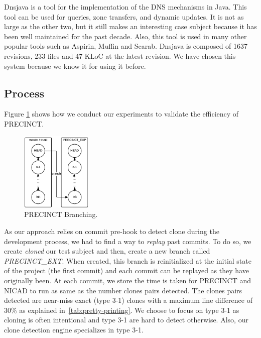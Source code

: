 \documentclass[conference]{IEEEtran}
\begin{document}
Dnsjava \cite{Wellington2013} is a tool for the implementation of the DNS mechanisms in Java.
This tool can be used for queries, zone transfers, and dynamic updates.
It is not as large as the other two, but it still makes an interesting case subject because it has been well maintained for the past decade.
Also, this tool is used in many other popular tools such as Aspirin, Muffin and
Scarab.
Dnsjava is composed of 1637 revisions, 233 files and 47 KLoC at the latest revision.
We have chosen this system because we know it for using it before\cite{Nayrolles2015c}.

\subsection{Process}
\label{sub:Process}


Figure \ref{fig:precinct-branching} shows how we conduct our experiments to validate the efficiency of PRECINCT.

\begin{figure}
  \centering
    \includegraphics[width=0.3\textwidth]{media/branch.png}
    \caption{PRECINCT Branching.\label{fig:precinct-branching}}
\end{figure}

As our approach relies on commit pre-hook to detect clone during the development process, we had to find a way to \textit{replay} past commits.
To do so, we create \textit{cloned} our test subject and then, create a new branch called \textit{PRECINCT\_EXT}.
When created, this branch is reinitialized at the initial state of the project (the first commit) and each commit can be replayed as they have originally been.
At each commit, we store the time is taken for PRECINCT and NICAD to run as same as the number clones pairs detected.
The clones pairs detected are near-miss exact (type 3-1) clones with a maximum line difference of 30\% as explained in~\ref{tab:pretty-printing}.
We choose to focus on type 3-1 as cloning is often intentional \cite{Kim2005} and type 3-1 are hard to detect otherwise.
Also, our clone detection engine specializes in type 3-1.
\end{document}
